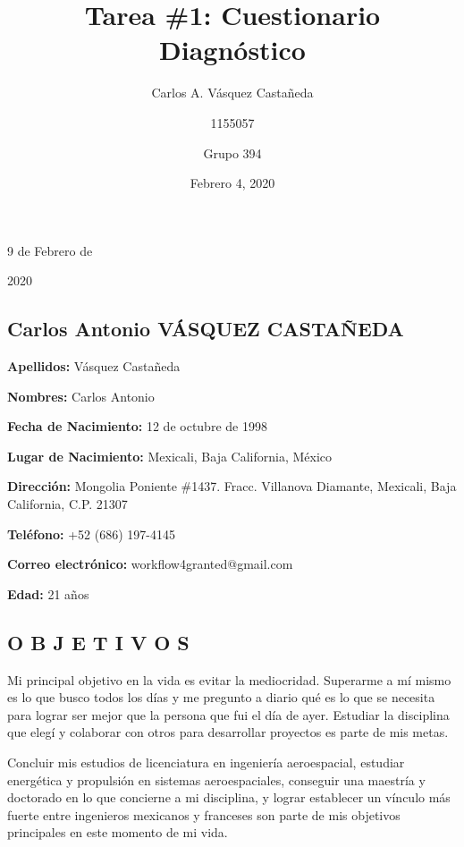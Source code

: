 \documentclass[12pt, letterpaper]{article}
\title{Tarea \#1: Cuestionario Diagnóstico}
\author{Carlos A. Vásquez Castañeda \and 1155057 \and Grupo 394}
\date{Febrero 4, 2020}
\begin{document}

\begin{shaded}

\begin{flushleft}
	9 de Febrero de
\end{flushleft}
	\begin{flushleft}
		\vspace{-0.6cm}
		\hspace{0.8cm}
		2020
	\end{flushleft}
\begin{flushright}
	\vspace{-2.5cm}
\section*{Carlos Antonio VÁSQUEZ CASTAÑEDA}
\end{flushright}
\end{shaded}

\textbf{Apellidos:} Vásquez Castañeda

\textbf{Nombres:} Carlos Antonio

\textbf{Fecha de Nacimiento:} 12 de octubre de 1998

\textbf{Lugar de Nacimiento:} Mexicali, Baja California, México

\textbf{Dirección:} Mongolia Poniente \#1437. Fracc. Villanova Diamante, Mexicali, Baja California, C.P. 21307

\textbf{Teléfono:} +52 (686) 197-4145

\textbf{Correo electrónico:} workflow4granted@gmail.com

\textbf{Edad:} 21 años

\subsection*{\textcolor{title}{O B J E T I V O S}}
Mi principal objetivo en la vida es evitar la mediocridad. Superarme a mí mismo es lo que busco todos los días y me pregunto a diario qué es lo que se necesita para lograr ser mejor que la persona que fui el día de ayer. Estudiar la disciplina que elegí y colaborar con otros para desarrollar proyectos es parte de mis metas. 

Concluir mis estudios de licenciatura en ingeniería aeroespacial, estudiar energética y propulsión en sistemas aeroespaciales, conseguir una maestría y doctorado en lo que concierne a mi disciplina, y lograr establecer un vínculo más fuerte entre ingenieros mexicanos y franceses son parte de mis objetivos principales en este momento de mi vida.
\end{document}
